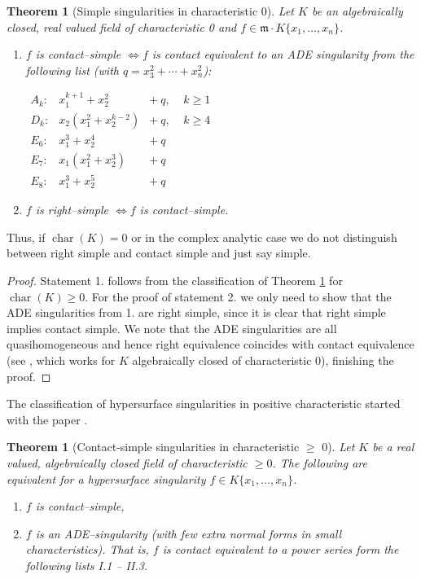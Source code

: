 \documentclass[11pt]{article}
\DeclareMathOperator{\Char}{char}
\newtheorem{Theorem}[Definition]{Theorem}
\newcommand{\fm}{\mathfrak{m}}
\begin{document}
\begin{Theorem}[Simple singularities in characteristic 0] \label{thm:ADE-char0}
Let $K$ be an algebraically closed, real valued  field of characteristic 0 and $f\in \fm \cdot K\{x_1,...,x_n\}$.
\begin {enumerate}
\item  $f$ is contact--simple $\Leftrightarrow f$ is contact equivalent to an ADE singularity from the following list (with $q=x_3^2+\cdots + x_n^2$):
\medskip

$
\begin{array}{llll}
A_k: & x_1^{k+1} + x_2^2    &+\ q,\ \ \ \ \ k\geq 1\\
D_k: & x_2(x_1^2+x_2^{k-2}) &+\ q, \ \ \ \ \ k\geq 4\\
E_6: & x_1^3+x_2^4   &+ \ q\\
E_7: & x_1(x_1^2+x_2^3) &+\ q\\
E_8: & x_1^3+x_2^5  &+\ q
\end{array}
$
\medskip

\item $f$ is right--simple $\Leftrightarrow f$ is contact--simple. 
\end {enumerate}
\end {Theorem}
Thus, if $\Char(K)=0$ or in the complex analytic case we do not distinguish between right simple and contact simple and just say simple.

\begin{proof}
Statement 1. follows from the classification of Theorem \ref{thm:GrKr} for $\Char(K) \ge 0$.  For the proof of statement 2. we only need to show that the ADE singularities from 1. are right simple, since it is clear that right simple implies contact simple.
 We note that the ADE singularities are all quasihomogeneous  and hence right equivalence coincides with contact equivalence (see \cite[Lemma1.2.13\
 ]{GLS25}, which works for $K$ algebraically closed of  characteristic 0), finishing the proof. 
\end{proof}

The classification of hypersurface singularities in positive characteristic started with the  paper \cite[Theorem 1.4]{GrKr90}.

\begin{Theorem}[Contact-simple singularities in characteristic $\ge$ 0] \label{thm:GrKr}  Let $K$ be a real valued, algebraically closed field of characteristic $\ge 0$. 
The following are equivalent for a hypersurface singularity 
\mbox{$f \in  K\{x_1, \ldots, x_n\}$}.
\begin{enumerate}
\item [(1)] $f$ is contact--simple,
\item [(2)] $f$ is an ADE--singularity (with few extra normal forms in small characteristics). That is, $f$ is contact equivalent to a power series form the following lists I.1 -- II.3.
\end{enumerate}
\end{Theorem}
\end{document}
